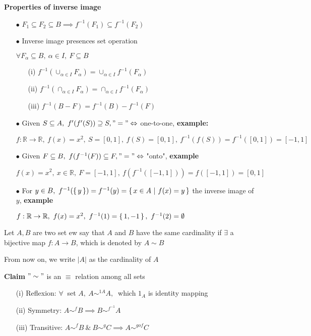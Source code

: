 \newpage

\textbf{Properties of inverse image}

\begin{enumerate}
	\item[$\bullet$] $F_1 \subseteq F_2 \subseteq B \implies f^{-1}(F_1) \subseteq f^{-1}(F_2)$
	\item[$\bullet$] Inverse image presences set operation
		
		$\forall F_{\alpha} \subseteq B,~\alpha \in I,~F\subseteq B$
		\begin{enumerate}
			\item[(i)] $f^{-1}(\cup_{\alpha \in I}F_{\alpha}) = \cup_{\alpha \in I}f^{-1}(F_{\alpha})$
			\item[(ii)] $f^{-1}(\cap_{\alpha \in I}F_{\alpha}) = \cap_{\alpha \in I}f^{-1}(F_{\alpha})$
			\item[(iii)] $f^{-1}(B - F) = f^{-1}(B) - f^{-1}(F) $
		\end{enumerate}
	\item[$\bullet$] Given $S \subseteq A,~f'(f'(S)) \supseteq S, "=" \Leftrightarrow$ one-to-one, \textbf{example:}
	
	$f:\mathbb R \rightarrow \mathbb R,~f(x) = x^2,~S=[0,1],~f(S) = [0,1],~f^{-1}(f(S)) = f^{-1}([0,1]) = [-1,1]$
	
	\item[$\bullet$] Given $F \subseteq B,~f(f^{-1}(F)) \subseteq F, "=" \Leftrightarrow$ "onto", \textbf{example}
	
	$f(x) = x^2,~x \in \mathbb R,~F = [-1,1],~f(f^{-1}([-1,1])) = f([-1,1]) = [0,1]$
	
	\item[$\bullet$] For $y \in B,~f^{-1}(\left\{ \,y \,\right\}) = f^{-1}(y) = \left\{ \,x \in A ~|~ f(x) = y \,\right\}$ the inverse image of $y$, \textbf{example}
	
	$f:\mathbb R \rightarrow \mathbb R,~f(x) = x^2,~f^{-1}(1) = \left\{ \,1,-1 \,\right\},~f^{-1}(2) = \emptyset$
\end{enumerate}

\begin{defn}[cardinality]
	Let $A,B$ are two set ew say that $A$ and $B$ have the same cardinality if $\exists$ a bijective map $f:A \rightarrow B$, which is denoted by $A \sim B$
	
	From now on, we write $|A|$ as the cardinality of $A$
\end{defn}

\textbf{Claim} $"\sim"$ is an $\equiv$ relation among all sets

\begin{enumerate}
	\item[(i)] Reflexion: $\forall~$ set $A,~A\sim^{1A} A,~$ which $1_A$ is identity mapping
	\item[(ii)] Symmetry: $A \sim^{f}B \implies B\sim^{f^{-1}} A$
	\item[(iii)] Transitive: $A \sim^{f} B ~\&~ B\sim^{g}C \implies A \sim^{g o f}C$
\end{enumerate}

